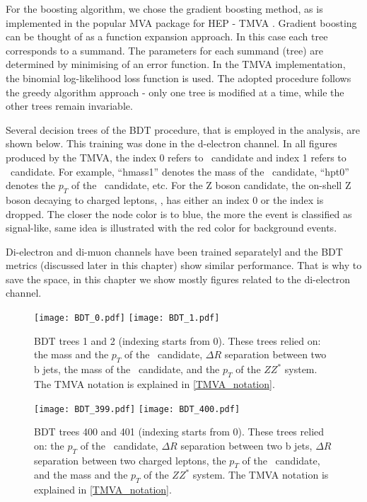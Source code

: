 For the boosting algorithm, we chose the gradient boosting method, as is implemented in the popular MVA package for HEP - TMVA \cite{Hocker:2007ht}.  Gradient boosting can be thought of as a function expansion approach. In this case each tree corresponds to a summand. The parameters for each summand (tree) are determined by minimising of an error function. In the TMVA implementation, the binomial log-likelihood loss function is used. The adopted procedure follows the greedy algorithm approach - only one tree is modified at a time, while the other trees remain invariable.

 Several decision trees of the BDT procedure, that is employed in the analysis, are shown below. This training was done in the d-electron channel. In all figures produced by the TMVA, the index 0 refers to \HZZ~candidate and index 1 refers to \HBB~candidate. For example, ``hmass1'' denotes the mass of the \HZZ~candidate, ``hpt0'' denotes the $p_T$ of the \HBB~candidate, etc. For the Z boson candidate, the on-shell Z boson decaying to charged leptons, \Zll, has either an index 0 or the index is dropped. The closer the node color is to blue, the more the event is classified as signal-like, same idea is illustrated with the red color for background events. \label{TMVA_notation}

Di-electron and di-muon channels have been trained separatelyl and the BDT metrics (discussed later in this chapter) show similar performance. That is why to save the space, in this chapter we show mostly figures related to the di-electron channel.
           
 \begin{figure}[H]
  \begin{center}
    \texttt{[image: BDT\_0.pdf]}
    \texttt{[image: BDT\_1.pdf]}\\
     \caption{BDT trees 1 and 2 (indexing starts from 0). These trees relied on: the mass and the $p_T$ of the \Zll~candidate, $\Delta R$ separation between two b jets,  the mass of the \HBB~candidate, and the $p_T$ of the $ZZ^*$ system. The TMVA notation is explained in \ref{TMVA_notation}.}
    \label{fig:bdt_trees}
  \end{center}
\end{figure}

\begin{figure}[H]
  \begin{center}
    \texttt{[image: BDT\_399.pdf]}
    \texttt{[image: BDT\_400.pdf]}\\
     \caption{BDT trees 400 and 401 (indexing starts from 0). These trees relied on: the $p_T$ of the \Zll~candidate, 
     $\Delta R$ separation between two b jets,
     $\Delta R$ separation between two charged leptons, 
      the $p_T$ of the \HBB~candidate, and the mass and the $p_T$ of the $ZZ^*$ system. The TMVA notation is explained in \ref{TMVA_notation}.}    
      \label{fig:bdt_trees_2}
  \end{center}
\end{figure}

